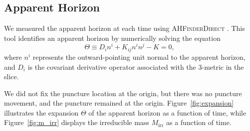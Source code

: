 \documentclass[%
 reprint,
 amsmath,amssymb,
 aps,
 prd,
]{revtex4-2}
\begin{document}
%
%
%
%

\subsection{Apparent Horizon}

We measured the apparent horizon at each time using \textsc{AHFinderDirect} \cite{Thornburg:1995cp, Thornburg:2003sf}. This tool identifies an apparent horizon by numerically solving the equation
\begin{equation}
	\Theta \equiv D_i n^i + K_{ij} n^i n^j - K = 0,
\end{equation}
where $n^i$ represents the outward-pointing unit normal to the apparent horizon, and $D_i$ is the covariant derivative operator associated with the 3-metric in the slice.

We did not fix the puncture location at the origin, but there was no puncture movement, and the puncture remained at the origin. Figure~\ref{fig:expansion} illustrates the expansion $\Theta$ of the apparent horizon as a function of time, while Figure~\ref{fig:m_irr} displays the irreducible mass $M_\mathrm{irr}$ as a function of time.
\end{document}
